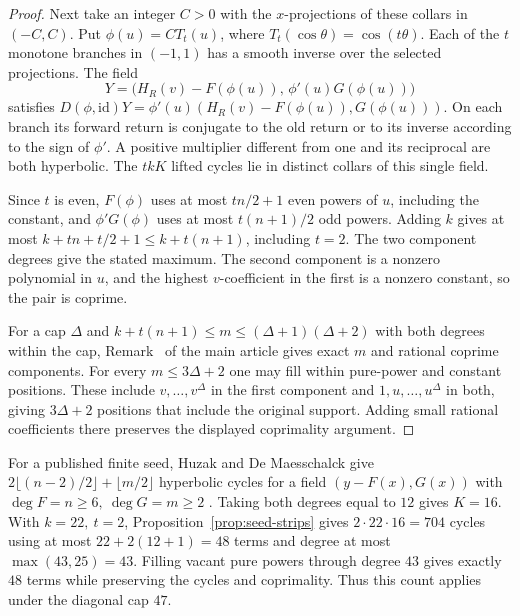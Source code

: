 \begin{proof}
Next take an integer \(C>0\) with the \(x\)-projections of these collars in \((-C,C)\). Put \(\phi(u)=CT_t(u)\), where \(T_t(\cos\theta)=\cos(t\theta)\). Each of the \(t\) monotone branches in \((-1,1)\) has a smooth inverse over the selected projections. The field
\begin{equation}\label{eq:seed-fold-field}
 Y=\bigl(H_R(v)-F(\phi(u)),\,\phi'(u)G(\phi(u))\bigr)
\end{equation}
satisfies \(D(\phi,\mathrm{id})Y=\phi'(u)(H_R(v)-F(\phi(u)),G(\phi(u)))\). On each branch its forward return is conjugate to the old return or to its inverse according to the sign of \(\phi'\). A positive multiplier different from one and its reciprocal are both hyperbolic. The \(tkK\) lifted cycles lie in distinct collars of this single field.

Since \(t\) is even, \(F(\phi)\) uses at most \(tn/2+1\) even powers of \(u\), including the constant, and \(\phi'G(\phi)\) uses at most \(t(n+1)/2\) odd powers. Adding \(k\) gives at most \(k+tn+t/2+1\le k+t(n+1)\), including \(t=2\). The two component degrees give the stated maximum. The second component is a nonzero polynomial in \(u\), and the highest \(v\)-coefficient in the first is a nonzero constant, so the pair is coprime.

For a cap \(\Delta\) and \(k+t(n+1)\le m\le(\Delta+1)(\Delta+2)\) with both degrees within the cap, Remark~ of the main article gives exact \(m\) and rational coprime components. For every \(m\le3\Delta+2\) one may fill within pure-power and constant positions. These include \(v,\ldots,v^\Delta\) in the first component and \(1,u,\ldots,u^\Delta\) in both, giving \(3\Delta+2\) positions that include the original support. Adding small rational coefficients there preserves the displayed coprimality argument.

\end{proof}

For a published finite seed, Huzak and De Maesschalck give \(2\lfloor(n-2)/2\rfloor+\lfloor m/2\rfloor\) hyperbolic cycles for a field \((y-F(x),G(x))\) with \(\deg F=n\ge6,\ \deg G=m\ge2\) \cite[Theorem~1.1, p.~2]{HuzakDeMaesschalck2014}. Taking both degrees equal to \(12\) gives \(K=16\). With \(k=22,\ t=2\), Proposition~\ref{prop:seed-strips} gives \(2\cdot22\cdot16=704\) cycles using at most \(22+2(12+1)=48\) terms and degree at most \(\max(43,25)=43\). Filling vacant pure powers through degree \(43\) gives exactly \(48\) terms while preserving the cycles and coprimality. Thus this count applies under the diagonal cap \(47\).

